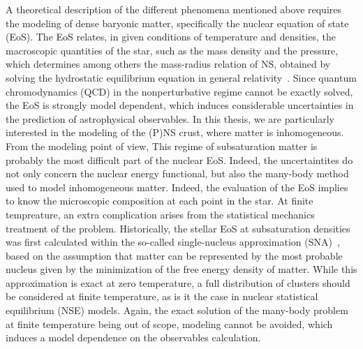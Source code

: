 A theoretical description of the different phenomena mentioned above requires 
the modeling of dense baryonic matter, specifically the nuclear equation of 
state (EoS). 
%
The EoS relates, in given conditions of temperature and 
densities, the macroscopic quantities of the star, such as the mass density and 
the pressure, which determines among others the mass-radius relation of NS, 
obtained by solving the hydrostatic equilibrium equation in general
relativity~\cite{Tolman1939,Oppenheimer1939}.
%
Since quantum chromodynamics (QCD) in the nonperturbative regime cannot be 
exactly solved, the EoS is strongly model dependent, which induces considerable 
uncertainties in the prediction of astrophysical observables. 
In this thesis, we are particularly interested in the modeling of the (P)NS 
crust, where matter is inhomogeneous. From the modeling point of view, This 
regime of subsaturation matter is probably the most difficult part of the 
nuclear EoS. Indeed, the uncertaintites do not only concern the nuclear energy 
functional, but also the many-body method used to model inhomogeneous matter. 
%
Indeed, the evaluation of the EoS implies to know the microscopic composition 
at each point in the star. At finite tempreature, an extra complication arises
from the statistical mechanics treatment of the problem. 
Historically, the stellar EoS at subsaturation 
densities was first calculated within the so-called single-nucleus 
approximation (SNA)~\cite{BBP,Negele1973}, based on the assumption that matter 
can be represented by the most probable nucleus given by the minimization of 
the free energy density of matter. While this approximation is exact at zero
temperature, a full distribution of clusters should be considered at finite
temperature, as is it the case in nuclear statistical equilibrium (NSE) models. 
Again, the exact solution of the many-body problem at finite temperature being 
out of scope, modeling cannot be avoided, which induces a model dependence on 
the observables calculation. 

